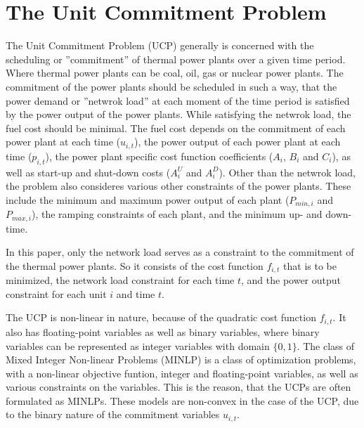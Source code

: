 \section{The Unit Commitment Problem} \label{intro:ucp}

The Unit Commitment Problem (UCP) generally is concerned with the scheduling or ''commitment''
of thermal power plants over a given time period.
Where thermal power plants can be coal, oil, gas or nuclear power plants.
The commitment of the power plants should be scheduled in such a way,
that the power demand or ''netwrok load'' at each moment of the time period
is satisfied by the power output of the power plants.
While satisfying the netwrok load, the fuel cost should be minimal.
The fuel cost depends on the commitment of each power plant at each time ($u_{i, t}$),
the power output of each power plant at each time ($p_{i, t}$),
the power plant specific cost function coefficients ($A_i$, $B_i$ and $C_i$),
as well as start-up and shut-down costs ($A_{i}^{U}$ and $A_{i}^{D}$).
Other than the netwrok load, the problem also consideres various other constraints of the power plants.
These include the minimum and maximum power output of each plant ($P_{min,i}$ and $P_{max,i}$),
the ramping constraints of each plant,
and the minimum up- and down-time.
\cite{Baldick1995}

In this paper, only the network load serves as a constraint to the commitment of the thermal power plants.
So it consists of the cost function $f_{i, t}$ that is to be minimized,
the network load constraint for each time $t$,
and the power output constraint for each unit $i$ and time $t$.

The UCP is non-linear in nature, because of the quadratic cost function $f_{i, t}$.
It also has floating-point variables as well as binary variables,
where binary variables can be represented as integer variables with domain $\{0, 1\}$.
The class of Mixed Integer Non-linear Problems (MINLP) is a class of optimization problems,
with a non-linear objective funtion,
integer and floating-point variables,
as well as various constraints on the variables.
This is the reason, that the UCPs are often formulated as MINLPs.
These models are non-convex in the case of the UCP, due to the binary nature of the commitment variables $u_{i, t}$.
\cite{Baldick1995, Abujarad2017}